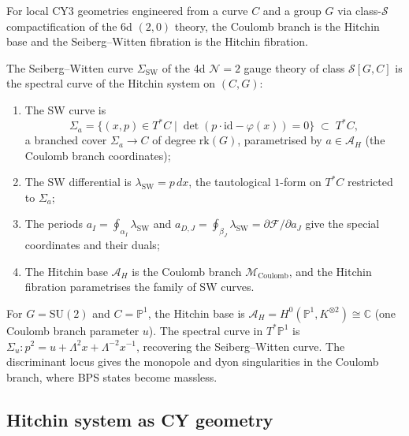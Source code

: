 For local CY3 geometries engineered from a curve $C$ and a group $G$ via
class-$\mathcal{S}$ compactification of the 6d $(2,0)$ theory, the Coulomb
branch is the Hitchin base and the Seiberg--Witten fibration is the Hitchin
fibration.

\begin{theorem}
\label{thm:phys-sw-hitchin}
The Seiberg--Witten curve $\Sigma_{\mathrm{SW}}$ of the 4d $\mathcal{N}=2$
gauge theory of class $\mathcal{S}[G, C]$ is the spectral curve of the Hitchin
system on $(C, G)$:
\begin{enumerate}[label=(\roman*)]
\item The SW curve is
 \[
 \Sigma_a = \bigl\{(x, p) \in T^*C \;\big|\; \det(p\cdot\mathrm{id} - \varphi(x)) = 0\bigr\}
 \;\subset\; T^*C,
 \]
 a branched cover $\Sigma_a \to C$ of degree $\mathrm{rk}(G)$, parametrised
 by $a \in \mathcal{A}_H$ (the Coulomb branch coordinates);
\item The SW differential is $\lambda_{\mathrm{SW}} = p\,dx$, the tautological
 $1$-form on $T^*C$ restricted to $\Sigma_a$;
\item The periods $a_I = \oint_{\alpha_I} \lambda_{\mathrm{SW}}$ and
 $a_{D,J} = \oint_{\beta_J} \lambda_{\mathrm{SW}} = \partial\mathcal{F}/\partial a_J$
 give the special coordinates and their duals;
\item The Hitchin base $\mathcal{A}_H$ is the Coulomb branch
 $\mathcal{M}_{\mathrm{Coulomb}}$, and the Hitchin fibration parametrises the
 family of SW curves.
\end{enumerate}
\end{theorem}

\begin{example}
\label{ex:phys-pure-su2}
For $G = \mathrm{SU}(2)$ and $C = \mathbb{P}^1$, the Hitchin base is
$\mathcal{A}_H = H^0(\mathbb{P}^1, K^{\otimes 2}) \cong \mathbb{C}$ (one
Coulomb branch parameter $u$). The spectral curve in $T^*\mathbb{P}^1$ is
$\Sigma_u\colon p^2 = u + \Lambda^2 x + \Lambda^{-2} x^{-1}$, recovering the
Seiberg--Witten curve. The discriminant locus gives the monopole and dyon
singularities in the Coulomb branch, where BPS states become massless.
\end{example}

\subsection{Hitchin system as CY geometry}
\label{subsec:phys-hitchin-cy-framework}

